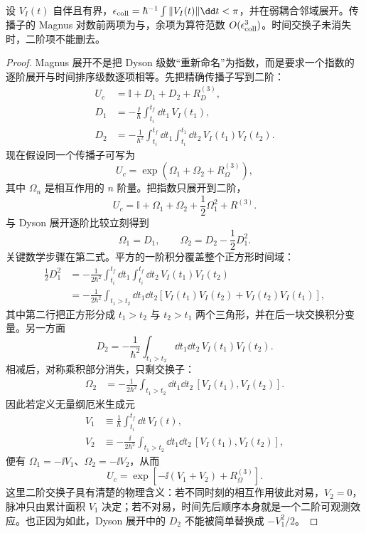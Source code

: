 \begin{proposition}
设 $V_I(t)$ 自伴且有界，$\epsilon_{\rm coll}=\hbar^{-1}\int\|V_I(t)\|\dd t<\pi$，并在弱耦合邻域展开。传播子的 Magnus 对数前两项为与，余项为算符范数 $O(\epsilon_{\rm coll}^3)$。时间交换子未消失时，二阶项不能删去。
\end{proposition}
\begin{proof}
Magnus 展开不是把 Dyson 级数“重新命名”为指数，而是要求一个指数的逐阶展开与时间排序级数逐项相等。先把精确传播子写到二阶：
\begin{align*}
 U_c
 &=\mathbb I+D_1+D_2+R_D^{(3)},\\
 D_1
 &=-\frac{\ii}{\hbar}\int_{t_i}^{t_f}\dd t_1\,V_I(t_1),\\
 D_2
 &=-\frac{1}{\hbar^2}
 \int_{t_i}^{t_f}\dd t_1
 \int_{t_i}^{t_1}\dd t_2\,
 V_I(t_1)V_I(t_2).
\end{align*}
现在假设同一个传播子可写为
\[
 U_c=\exp(\Omega_1+\Omega_2+R_\Omega^{(3)}),
\]
其中 $\Omega_n$ 是相互作用的 $n$ 阶量。把指数只展开到二阶，
\begin{equation*}
 U_c
 =\mathbb I+\Omega_1+\Omega_2
 +\frac12\Omega_1^2+R^{(3)}.
\end{equation*}
与 Dyson 展开逐阶比较立刻得到
\begin{equation*}
 \Omega_1=D_1,
 \qquad
 \Omega_2=D_2-\frac12D_1^2.
\end{equation*}
关键数学步骤在第二式。平方的一阶积分覆盖整个正方形时间域：
\begin{align*}
 \frac12D_1^2
 &=-\frac{1}{2\hbar^2}
 \int_{t_i}^{t_f}\dd t_1\int_{t_i}^{t_f}\dd t_2\,
 V_I(t_1)V_I(t_2)\\
 &=-\frac{1}{2\hbar^2}
 \int_{t_1>t_2}\dd t_1\dd t_2
 \left[V_I(t_1)V_I(t_2)+V_I(t_2)V_I(t_1)\right],
\end{align*}
其中第二行把正方形分成 $t_1>t_2$ 与 $t_2>t_1$ 两个三角形，并在后一块交换积分变量。另一方面
\begin{equation*}
 D_2=-\frac{1}{\hbar^2}
 \int_{t_1>t_2}\dd t_1\dd t_2\,
 V_I(t_1)V_I(t_2).
\end{equation*}
相减后，对称乘积部分消失，只剩交换子：
\begin{align*}
 \Omega_2
 &=-\frac{1}{2\hbar^2}
 \int_{t_1>t_2}\dd t_1\dd t_2\,
 \left[V_I(t_1),V_I(t_2)\right].
\end{align*}
因此若定义无量纲厄米生成元
\begin{align*}
 V_1&\equiv\frac1\hbar\int_{t_i}^{t_f}\dd t\,V_I(t),\\
 V_2&\equiv-\frac{\ii}{2\hbar^2}
 \int_{t_1>t_2}\dd t_1\dd t_2\,
 [V_I(t_1),V_I(t_2)],
\end{align*}
便有 $\Omega_1=-\ii V_1$、$\Omega_2=-\ii V_2$，从而
\begin{equation*}
 U_c
 =\exp\!\left[-\ii(V_1+V_2)+R_\Omega^{(3)}\right].
\end{equation*}
这里二阶交换子具有清楚的物理含义：若不同时刻的相互作用彼此对易，$V_2=0$，脉冲只由累计面积 $V_1$ 决定；若不对易，时间先后顺序本身就是一个二阶可观测效应。也正因为如此，Dyson 展开中的 $D_2$ 不能被简单替换成 $-V_1^2/2$。
\end{proof}


